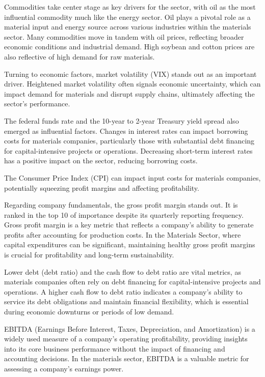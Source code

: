 \documentclass[12pt,a4paper,english]{article}
\begin{document}
Commodities take center stage as key drivers for the sector, with oil as the most influential commodity much like the energy sector. Oil plays a pivotal role as a material input and energy source across various industries within the materials sector. Many commodities move in tandem with oil prices, reflecting broader economic conditions and industrial demand. High soybean and cotton prices are also reflective of high demand for raw materials.

Turning to economic factors, market volatility (VIX) stands out as an important driver. Heightened market volatility often signals economic uncertainty, which can impact demand for materials and disrupt supply chains, ultimately affecting the sector's performance.

The federal funds rate and the 10-year to 2-year Treasury yield spread also emerged as influential factors. Changes in interest rates can impact borrowing costs for materials companies, particularly those with substantial debt financing for capital-intensive projects or operations. Decreasing short-term interest rates has a positive impact on the sector, reducing borrowing costs.

The Consumer Price Index (CPI) can impact input costs for materials companies, potentially squeezing profit margins and affecting profitability.

Regarding company fundamentals, the gross profit margin stands out. It is ranked in the top 10 of importance despite its quarterly reporting frequency. Gross profit margin is a key metric that reflects a company's ability to generate profits after accounting for production costs. In the Materials Sector, where capital expenditures can be significant, maintaining healthy gross profit margins is crucial for profitability and long-term sustainability.

Lower debt (debt ratio) and the cash flow to debt ratio are vital metrics, as materials companies often rely on debt financing for capital-intensive projects and operations. A higher cash flow to debt ratio indicates a company's ability to service its debt obligations and maintain financial flexibility, which is essential during economic downturns or periods of low demand.

EBITDA (Earnings Before Interest, Taxes, Depreciation, and Amortization) is a widely used measure of a company's operating profitability, providing insights into its core business performance without the impact of financing and accounting decisions. In the materials sector, EBITDA is a valuable metric for assessing a company's earnings power.
\end{document}
